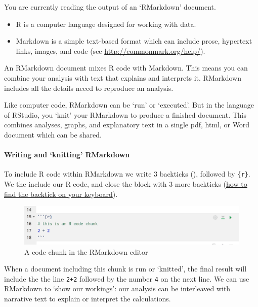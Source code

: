 \documentclass[]{article}
\providecommand{\tightlist}{%
  \setlength{\itemsep}{0pt}\setlength{\parskip}{0pt}}
\let\oldparagraph\paragraph
\renewcommand{\paragraph}[1]{\oldparagraph{#1}\mbox{}}
\theoremstyle{definition}
\theoremstyle{definition}
\theoremstyle{definition}
\theoremstyle{remark}
\begin{document}
You are currently reading the output of an `RMarkdown' document.

\begin{itemize}
\tightlist
\item
  R is a computer language designed for working with data.
\item
  Markdown is a simple text-based format which can include prose,
  hypertext links, images, and code (see
  \url{http://commonmark.org/help/}).
\end{itemize}

An RMarkdown document mixes R code with Markdown. This means you can
combine your analysis with text that explains and interprets it.
RMarkdown includes all the details neeed to reproduce an analysis.

Like computer code, RMarkdown can be `run' or `executed'. But in the
language of RStudio, you `knit' your RMarkdown to produce a finished
document. This combines analyses, graphs, and explanatory text in a
single pdf, html, or Word document which can be shared.

\paragraph{\texorpdfstring{Writing and `knitting'
RMarkdown}{Writing and knitting RMarkdown}}\label{writing-and-knitting-rmarkdown}

To include R code within RMarkdown we write 3 backticks
(\texttt{\textasciigrave{}\textasciigrave{}\textasciigrave{}}), followed
by \texttt{\{r\}}. We the include our R code, and close the block with 3
more backticks (\protect\hyperlink{backtick-location}{how to find the
backtick on your keyboard}).

\begin{figure}
\centering
\includegraphics{media/r-code-chunk.png}
\caption{A code chunk in the RMarkdown editor}
\end{figure}

When a document including this chunk is run or `knitted', the final
result will include the the line \texttt{2+2} followed by the number
\texttt{4} on the next line. We can use RMarkdown to `show our
workings': our analysis can be interleaved with narrative text to
explain or interpret the calculations.
\end{document}
